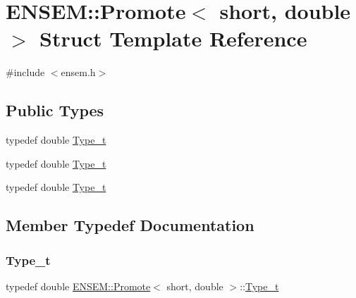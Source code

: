 \hypertarget{structENSEM_1_1Promote_3_01short_00_01double_01_4}{}\section{E\+N\+S\+EM\+:\+:Promote$<$ short, double $>$ Struct Template Reference}
\label{structENSEM_1_1Promote_3_01short_00_01double_01_4}


{\ttfamily \#include $<$ensem.\+h$>$}

\subsection*{Public Types}
\begin{DoxyCompactItemize}
\item 
typedef double \mbox{\hyperlink{structENSEM_1_1Promote_3_01short_00_01double_01_4_acad0693c601980c2646626dac6d30140}{Type\+\_\+t}}
\item 
typedef double \mbox{\hyperlink{structENSEM_1_1Promote_3_01short_00_01double_01_4_acad0693c601980c2646626dac6d30140}{Type\+\_\+t}}
\item 
typedef double \mbox{\hyperlink{structENSEM_1_1Promote_3_01short_00_01double_01_4_acad0693c601980c2646626dac6d30140}{Type\+\_\+t}}
\end{DoxyCompactItemize}


\subsection{Member Typedef Documentation}
\mbox{\label{structENSEM_1_1Promote_3_01short_00_01double_01_4_acad0693c601980c2646626dac6d30140}} 
\subsubsection{\texorpdfstring{Type\_t}{Type\_t}\hspace{0.1cm}{\footnotesize\ttfamily [1/3]}}
{\footnotesize\ttfamily typedef double \mbox{\hyperlink{structENSEM_1_1Promote}{E\+N\+S\+E\+M\+::\+Promote}}$<$ short, double $>$\+::\mbox{\hyperlink{structENSEM_1_1Promote_3_01short_00_01double_01_4_acad0693c601980c2646626dac6d30140}{Type\+\_\+t}}}

